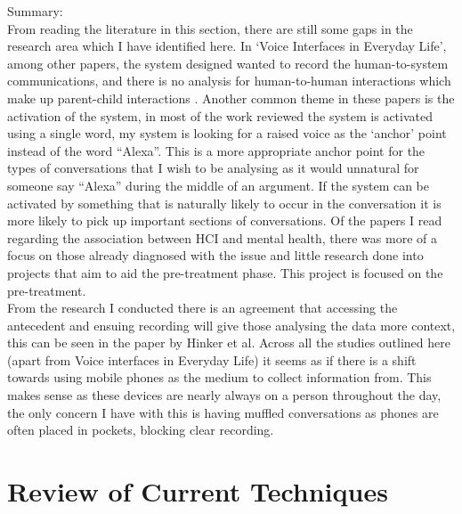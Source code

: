 \documentclass[a4paper,11pt]{report}
\begin{document}
Summary:\\
From reading the literature in this section, there are still some gaps in the research area which I have identified here. In ‘Voice Interfaces in Everyday Life’, among other papers, the system designed wanted to record the human-to-system communications, and there is no analysis for human-to-human interactions which make up parent-child interactions . Another common theme in these papers is the activation of the system, in most of the work reviewed the system is activated using a single word, my system is looking for a raised voice as the ‘anchor’ point instead of the word “Alexa”. This is a more appropriate anchor point for the types of conversations that I wish to be analysing as it would unnatural for someone say “Alexa” during the middle of an argument. If the system can be activated by something that is naturally likely to occur in the conversation it is more likely to pick up important sections of conversations. Of the papers I read regarding the association between HCI and mental health, there was more of a focus on those already diagnosed with the issue and little research done into projects that aim to aid the pre-treatment phase. This project is focused on the pre-treatment.\\

From the research I conducted there is an agreement that accessing the antecedent and ensuing recording will give those analysing the data more context, this can be seen in the paper by Hinker et al. Across all the studies outlined here (apart from Voice interfaces in Everyday Life) it seems as if there is a shift towards using mobile phones as the medium to collect information from. This makes sense as these devices are nearly always on a person throughout the day, the only concern I have with this is having muffled conversations as phones are often placed in pockets, blocking clear recording.\\

\section{Review of Current Techniques}
\end{document}
